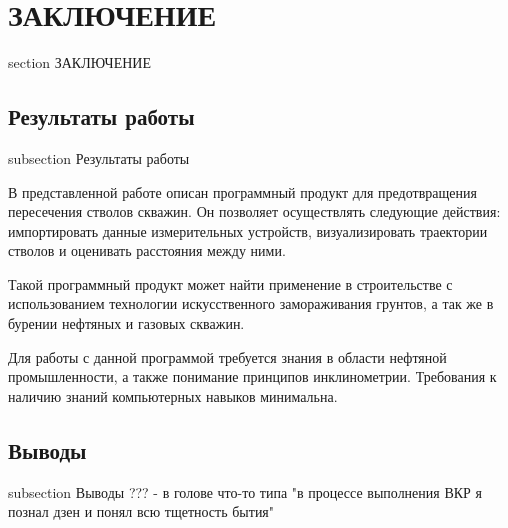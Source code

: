 \newpage
\section*{ЗАКЛЮЧЕНИЕ}
 {section} {ЗАКЛЮЧЕНИЕ}

\subsection*{Результаты работы}
 {subsection} {Результаты работы}

В представленной работе описан программный продукт для предотвращения пересечения стволов скважин.
Он позволяет осуществлять следующие действия:
импортировать данные измерительных устройств, визуализировать траектории стволов и оценивать расстояния между ними.

Такой программный продукт может найти применение в строительстве с использованием технологии искусственного замораживания
грунтов, а так же в бурении нефтяных и газовых скважин.

Для работы с данной программой требуется знания в области нефтяной промышленности, а также понимание принципов инклинометрии.
Требования к наличию знаний компьютерных навыков минимальна.

\subsection*{Выводы}
 {subsection} {Выводы}
??? - в голове что-то типа "в процессе выполнения ВКР я познал дзен и понял всю тщетность бытия"
